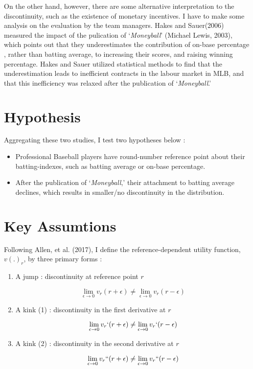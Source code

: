 \documentclass{jsarticle}[12pt]
\begin{document}
On the other hand, however, there are some alternative interpretation to the discontinuity, such as the existence of monetary incentives. I have to make some analysis on the evaluation by the team managers. Hakes and Sauer(2006) measured the impact of the pulication of `\textit{Moneyball}' (Michael Lewis, 2003), which points out that they underestimates the contribution of on-base percentage , rather than batting average, to increasing their scores, and raising winning percentage.  Hakes and Sauer utilized statistical methods to find that the underestimation leads to inefficient contracts in the labour market in MLB, and that this inefficiency was relaxed after the publication of `\textit{Moneyball}.'

\section{Hypothesis}

Aggregating these two studies, I test two hypotheses below :

 \begin{itemize}
 
 \item Professional Baseball players have round-number reference point about their batting-indexes, such as batting average or on-base percentage.
 
 \item After the publication of `\textit{Moneyball},' their attachment to batting average declines, which results in smaller/no discontinuity in the distribution.
 
 \end{itemize}

\section{Key Assumtions}

Following Allen, et al. (2017), I define the reference-dependent utility function, $v(.)_r$, by three primary forms :

 \begin{enumerate}
 
 \item A jump : discontinuity at reference point $r$
 
 \[ \lim_{\epsilon \to 0} v_r (r+ \epsilon) \neq \lim_{\epsilon \to 0} v_r (r -\epsilon) \]
 
 \item A kink (1) : discontinuity in the first derivative at $r$
 
 \[ \lim_{\epsilon \to 0} v_r ` (r+ \epsilon) \neq \lim_{\epsilon \to 0} v_r ` (r -\epsilon) \]
 
 \item A kink (2) : discontinuity in the second derivative at $r$
 
 \[ \lim_{\epsilon \to 0} v_r `` (r+ \epsilon) \neq \lim_{\epsilon \to 0} v_r `` (r -\epsilon) \]
 
 \end{enumerate}
\end{document}
